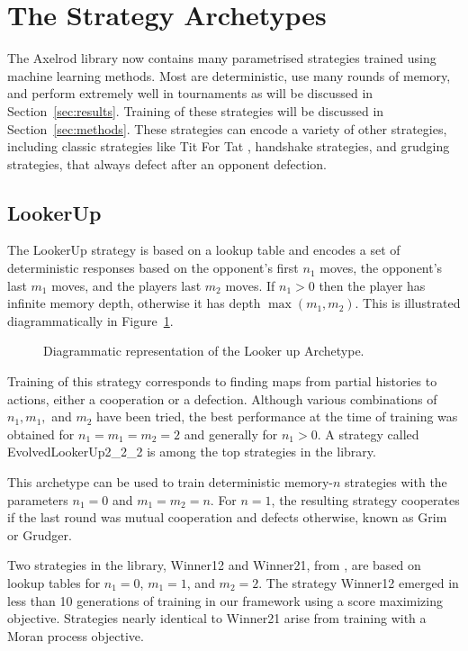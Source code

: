 \documentclass{article}
\begin{document}
\section{The Strategy Archetypes}

The Axelrod library now contains many parametrised strategies trained using
machine learning
methods. Most are deterministic, use many rounds of memory, and perform
extremely well in tournaments as will be discussed in Section~\ref{sec:results}.
Training of these strategies will be discussed in Section~\ref{sec:methods}.
These strategies can encode a variety
of other strategies, including classic strategies like Tit For Tat
\cite{Axelrod1980},
handshake strategies, and grudging strategies, that always defect after
an opponent defection.

\subsection{LookerUp}\label{sec:lookerup}

The LookerUp strategy is based on a lookup table and encodes a set of
deterministic responses based on the opponent's first $n_1$ moves, the
opponent's last $m_1$ moves, and the players last $m_2$ moves. If $n_1 > 0$ then
the player has infinite memory depth, otherwise it has depth $\max(m_1, m_2)$.
This is illustrated diagrammatically in Figure~\ref{fig:lookerup}.

\begin{figure}[!hbtp]
    \centering
    
    \caption{Diagrammatic representation of the Looker up Archetype.}
    \label{fig:lookerup}
\end{figure}


Training of this strategy corresponds to finding maps from partial histories to
actions, either a cooperation or a defection. Although various
combinations of $n_1, m_1,$ and $m_2$ have been tried, the best performance at
the time of
training was obtained for $n_1 = m_1 = m_2 = 2$ and generally for $n_1 > 0$.
A strategy
called EvolvedLookerUp2\_2\_2 is among the top strategies in the library.

This archetype can be used to train deterministic memory-$n$ strategies with the
parameters $n_1=0$ and $m_1=m_2=n$. For $n=1$, the resulting strategy cooperates
if the last round was mutual cooperation and defects otherwise, known as Grim or
Grudger.

Two strategies in the library, Winner12 and Winner21, from \cite{Mathieu2015},
are based on lookup tables for $n_1 = 0$, $m_1 = 1$, and $m_2=2$. The strategy
Winner12 emerged in less than 10 generations of training in our framework using
a score maximizing objective. Strategies nearly identical to Winner21 arise
from training with a Moran process objective.
\end{document}
